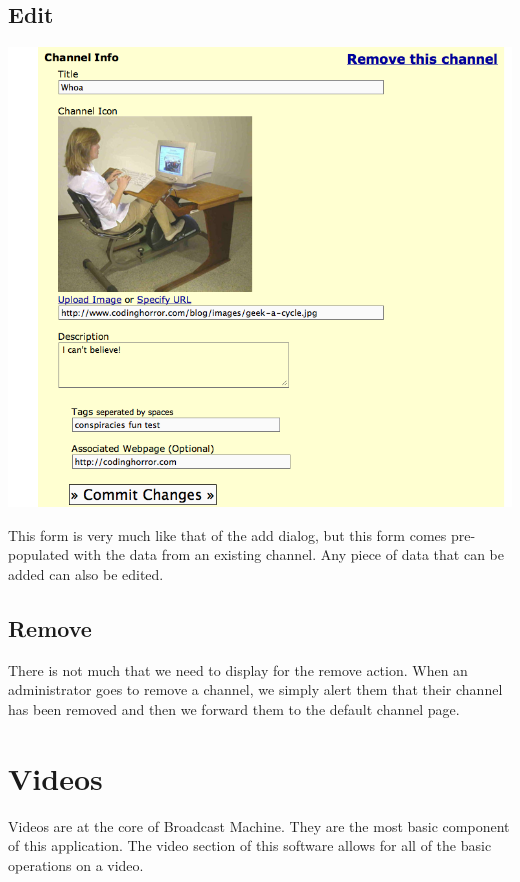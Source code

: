 \documentclass[a4paper,12pt]{report}
\begin{document}
\subsection{Edit}
\includegraphics[width=150mm]{images/channeledit.png}

This form is very much like that of the add dialog, but this form comes pre-populated with the data from an existing channel.
Any piece of data that can be added can also be edited.

\subsection{Remove}
There is not much that we need to display for the remove action.
When an administrator goes to remove a channel, we simply alert them that their channel has been removed and then we forward them to the default channel page.

\section{Videos}
Videos are at the core of Broadcast Machine.
They are the most basic component of this application.
The video section of this software allows for all of the basic operations on a video.
\end{document}
